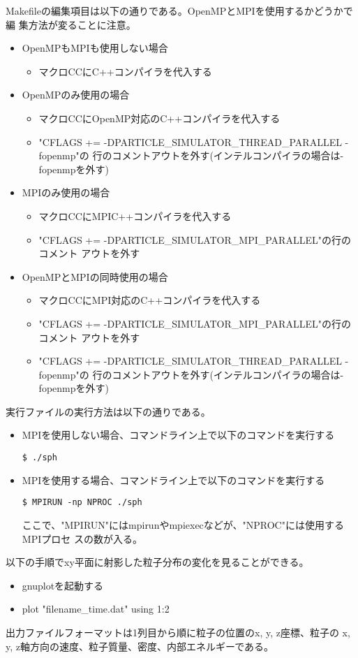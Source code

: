 Makefileの編集項目は以下の通りである。OpenMPとMPIを使用するかどうかで編
集方法が変ることに注意。
\begin{itemize}
\item OpenMPもMPIも使用しない場合
  \begin{itemize}
  \item マクロCCにC++コンパイラを代入する
  \end{itemize}

\item OpenMPのみ使用の場合
  \begin{itemize}
  \item マクロCCにOpenMP対応のC++コンパイラを代入する
  \item "CFLAGS += -DPARTICLE\_SIMULATOR\_THREAD\_PARALLEL -fopenmp"の
    行のコメントアウトを外す(インテルコンパイラの場合は-fopenmpを外す)
  \end{itemize}

\item MPIのみ使用の場合
  \begin{itemize}
  \item マクロCCにMPIC++コンパイラを代入する
  \item "CFLAGS += -DPARTICLE\_SIMULATOR\_MPI\_PARALLEL"の行のコメント
    アウトを外す
  \end{itemize}

\item OpenMPとMPIの同時使用の場合
  \begin{itemize}
  \item マクロCCにMPI対応のC++コンパイラを代入する
  \item "CFLAGS += -DPARTICLE\_SIMULATOR\_MPI\_PARALLEL"の行のコメント
    アウトを外す
  \item "CFLAGS += -DPARTICLE\_SIMULATOR\_THREAD\_PARALLEL -fopenmp"の
    行のコメントアウトを外す(インテルコンパイラの場合は-fopenmpを外す)
  \end{itemize}

\end{itemize}

実行ファイルの実行方法は以下の通りである。
\begin{itemize}
\item MPIを使用しない場合、コマンドライン上で以下のコマンドを実行する
\begin{screen}
\begin{verbatim}
$ ./sph
\end{verbatim}
\end{screen}
  
\item MPIを使用する場合、コマンドライン上で以下のコマンドを実行する
\begin{screen}
\begin{verbatim}
$ MPIRUN -np NPROC ./sph
\end{verbatim}
\end{screen}
ここで、"MPIRUN"にはmpirunやmpiexecなどが、"NPROC"には使用するMPIプロセ
スの数が入る。
\end{itemize}

以下の手順でxy平面に射影した粒子分布の変化を見ることができる。
\begin{itemize}
\item gnuplotを起動する
\item plot "filename\_time.dat" using 1:2
\end{itemize}
出力ファイルフォーマットは1列目から順に粒子の位置のx, y, z座標、粒子の
x, y, z軸方向の速度、粒子質量、密度、内部エネルギーである。
